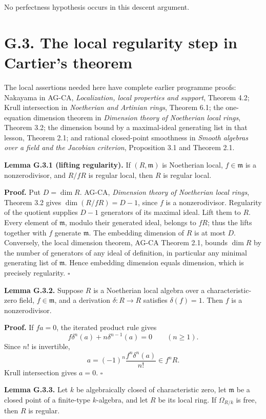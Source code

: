 \documentclass[11pt,a4paper,openany]{report}
\begin{document}
No perfectness hypothesis occurs in this descent argument.

\section{G.3. The local regularity step in Cartier's theorem}\label{AG-RG-S08-g.3.-the-local-regularity-step-in-cartiers-theorem}

The local assertions needed here have complete earlier programme proofs: Nakayama in AG-CA, \emph{Localization, local properties and support}, Theorem 4.2; Krull intersection in \emph{Noetherian and Artinian rings}, Theorem 6.1; the one-equation dimension theorem in \emph{Dimension theory of Noetherian local rings}, Theorem 3.2; the dimension bound by a maximal-ideal generating list in that lesson, Theorem 2.1; and rational closed-point smoothness in \emph{Smooth algebras over a field and the Jacobian criterion}, Proposition 3.1 and Theorem 2.1.

\textbf{Lemma G.3.1 (lifting regularity).} If \((R,\mathfrak m)\) is Noetherian local, \(f\in\mathfrak m\) is a nonzerodivisor, and \(R/fR\) is regular local, then \(R\) is regular local.

\textbf{Proof.} Put \(D=\dim R\). AG-CA, \emph{Dimension theory of Noetherian local rings}, Theorem 3.2 gives \(\dim(R/fR)=D-1\), since \(f\) is a nonzerodivisor. Regularity of the quotient supplies \(D-1\) generators of its maximal ideal. Lift them to \(R\). Every element of \(\mathfrak m\), modulo their generated ideal, belongs to \(fR\); thus the lifts together with \(f\) generate \(\mathfrak m\). The embedding dimension of \(R\) is at most \(D\). Conversely, the local dimension theorem, AG-CA Theorem 2.1, bounds \(\dim R\) by the number of generators of any ideal of definition, in particular any minimal generating list of \(\mathfrak m\). Hence embedding dimension equals dimension, which is precisely regularity. \(\square\)

\textbf{Lemma G.3.2.} Suppose \(R\) is a Noetherian local algebra over a characteristic-zero field, \(f\in\mathfrak m\), and a derivation \(\delta:R\to R\) satisfies \(\delta(f)=1\). Then \(f\) is a nonzerodivisor.

\textbf{Proof.} If \(fa=0\), the iterated product rule gives \[
f\delta^n(a)+n\delta^{n-1}(a)=0\qquad(n\geq1).
\] Since \(n!\) is invertible, \[
a=(-1)^n\frac{f^n\delta^n(a)}{n!}\in f^nR.
\] Krull intersection gives \(a=0\). \(\square\)

\textbf{Lemma G.3.3.} Let \(k\) be algebraically closed of characteristic zero, let \(\mathfrak m\) be a closed point of a finite-type \(k\)-algebra, and let \(R\) be its local ring. If \(\Omega_{R/k}\) is free, then \(R\) is regular.
\end{document}
